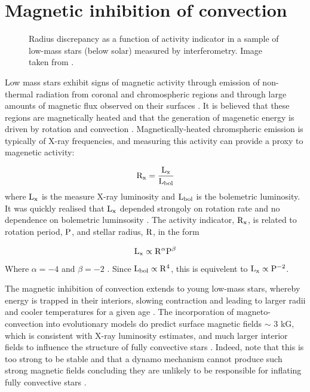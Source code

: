\section{Magnetic inhibition of convection}\label{magact}

\begin{figure}
\centering
\caption{Radius discrepancy as a function of activity indicator in a sample of low-mass stars (below solar) measured by interferometry. Image taken from \protect\cite{Spada2013}.}
\label{radiiactivity}
\end{figure}

Low mass stars exhibit signs of magnetic activity through emission of non-thermal radiation from coronal and chromospheric regions  \cite{Hall2008} and through large amounts of magnetic flux observed on their surfaces \cite{Reiners2012}. It is believed that these regions are magnetically heated and that the generation of magenetic energy is driven by rotation and convection \cite{Charbonneau2010}. Magnetically-heated chromspheric emission is typically of X-ray frequencies, and measuring this activity can provide a proxy to magenetic activity:

\begin{equation}
\rm R_x = \frac{\rm L_{\rm x}}{\rm L_{\rm bol}}
\end{equation} 
where $\rm L_{\rm x}$ is the measure X-ray luminosity and $\rm L_{\rm bol}$ is the bolemetric luminosity. It was quickly realised that $\rm L_{\rm x}$ depended strongoly on rotation rate and no dependence on bolemetric luminsosity \cite{Pallavicini1981}. The activity indicator, $\rm R_x$, is related to rotation period, $\rm P$, and stellar radius, $\rm R$, in the form

\begin{equation}
\rm L_{\rm x} \propto \rm R^{\alpha} \rm P^{\beta}
\end{equation}
Where $\alpha = -4$ and $\beta = -2$ \cite{Pallavicini1981,Reiners2014}. Since $\rm L_{\rm bol} \propto \rm R^4$, this is equivelent to $\rm L_{\rm x} \propto \rm P^{-2}$.


The magnetic inhibition of convection extends to young low-mass stars, whereby  energy is trapped in their interiors, slowing contraction and leading to larger radii and cooler temperatures for a given age \cite{Feiden2016}. The incorporation of magneto-convection into evolutionary models do predict surface magnetic fields $\sim$ 3 kG, which is consistent with X-ray luminosity estimates, and much larger interior fields to influence the structure of fully convective stars \cite{Feiden2013}. Indeed, \cite{Feiden2013} note that this is too strong to be stable and that a dynamo mechanism cannot produce such strong magnetic fields concluding they are unlikely to be responsible for inflating fully convective stars \cite{Browning2016}. 

